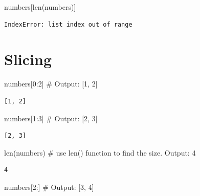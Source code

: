 \documentclass[
  letterpaper,
  DIV=11,
  numbers=noendperiod]{scrreprt}
\newenvironment{Shaded}{\begin{snugshade}}{\end{snugshade}}
\newcommand{\BuiltInTok}[1]{\textcolor[rgb]{0.00,0.23,0.31}{#1}}
\newcommand{\CommentTok}[1]{\textcolor[rgb]{0.37,0.37,0.37}{#1}}
\newcommand{\DecValTok}[1]{\textcolor[rgb]{0.68,0.00,0.00}{#1}}
\newcommand{\NormalTok}[1]{\textcolor[rgb]{0.00,0.23,0.31}{#1}}
\begin{document}
\begin{Shaded}
\begin{Highlighting}[]
\NormalTok{numbers[}\BuiltInTok{len}\NormalTok{(numbers)]}
\end{Highlighting}
\end{Shaded}

\begin{verbatim}
IndexError: list index out of range
\end{verbatim}

\hypertarget{slicing-2}{%
\section{Slicing}\label{slicing-2}}

\begin{Shaded}
\begin{Highlighting}[]
\NormalTok{numbers[}\DecValTok{0}\NormalTok{:}\DecValTok{2}\NormalTok{] }\CommentTok{\# Output: [1, 2]}
\end{Highlighting}
\end{Shaded}

\begin{verbatim}
[1, 2]
\end{verbatim}

\begin{Shaded}
\begin{Highlighting}[]
\NormalTok{numbers[}\DecValTok{1}\NormalTok{:}\DecValTok{3}\NormalTok{] }\CommentTok{\# Output: [2, 3]}
\end{Highlighting}
\end{Shaded}

\begin{verbatim}
[2, 3]
\end{verbatim}

\begin{Shaded}
\begin{Highlighting}[]
\BuiltInTok{len}\NormalTok{(numbers) }\CommentTok{\# use len() function to find the size. Output: 4}
\end{Highlighting}
\end{Shaded}

\begin{verbatim}
4
\end{verbatim}

\begin{Shaded}
\begin{Highlighting}[]
\NormalTok{numbers[}\DecValTok{2}\NormalTok{:]  }\CommentTok{\# Output: [3, 4]}
\end{Highlighting}
\end{Shaded}
\end{document}
